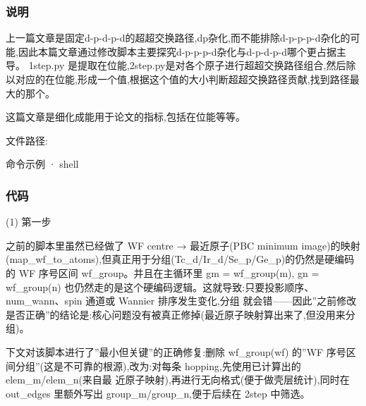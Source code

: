 \documentclass[lang=cn,scheme=chinese,color=blue,device=normal,toc=onecol,math=cm]{elegantbook}
\begin{document}
\subsubsection{说明}


上一篇文章是固定d-p-d-p-d的超超交换路径,dp杂化,而不能排除d-p-p-p-d杂化的可能,因此本篇文章通过修改脚本主要探究d-p-p-p-d杂化与d-p-d-p-d哪个更占据主导。 1step.py 是提取在位能,2step.py是对各个原子进行超超交换路径组合,然后除以对应的在位能,形成一个值,根据这个值的大小判断超超交换路径贡献,找到路径最大的那个。\par


这篇文章是细化成能用于论文的指标,包括在位能等等。\par


文件路径:\par


\begin{inlinecodebox}{命令示例 · shell}
\end{inlinecodebox}


\subsubsection{代码}


(1) 第一步\par


之前的脚本里虽然已经做了 WF centre → 最近原子(PBC minimum image)的映射(map\_\allowbreak{}wf\_\allowbreak{}to\_\allowbreak{}atoms),但真正用于分组(Tc\_\allowbreak{}d/\allowbreak{}Ir\_\allowbreak{}d/\allowbreak{}Se\_\allowbreak{}p/\allowbreak{}Ge\_\allowbreak{}p)的仍然是硬编码的 WF 序号区间 wf\_\allowbreak{}group。并且在主循环里 gm = wf\_\allowbreak{}group(m), gn = wf\_\allowbreak{}group(n) 也仍然走的是这个硬编码逻辑。这就导致:只要投影顺序、num\_\allowbreak{}wann、spin 通道或 Wannier 排序发生变化,分组 就会错——因此”之前修改是否正确”的结论是:核心问题没有被真正修掉(最近原子映射算出来了,但没用来分组)。\par


下文对该脚本进行了”最小但关键”的正确修复:删除 wf\_\allowbreak{}group(wf) 的”WF 序号区间分组”(这是不可靠的根源),改为:对每条 hopping,先使用已计算出的 elem\_\allowbreak{}m/\allowbreak{}elem\_\allowbreak{}n(来自最 近原子映射),再进行无向格式(便于做壳层统计),同时在 out\_\allowbreak{}edges 里额外写出 group\_\allowbreak{}m/\allowbreak{}group\_\allowbreak{}n,便于后续在 2step 中筛选。\par
\end{document}
